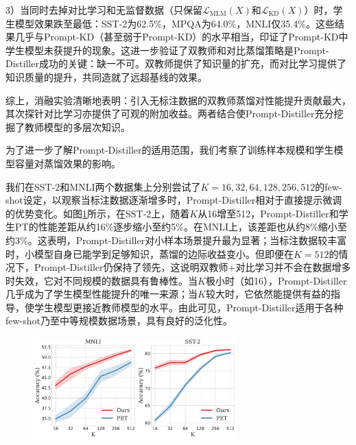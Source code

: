 \documentclass[../main.tex]{subfiles}
\begin{document}
3）当同时去掉对比学习和无监督数据（只保留$\mathcal{L}_{\text{MLM}}(X)$和$\mathcal{L}_{\text{KD}}(X)$）时，学生模型效果跌至最低：SST-2为62.5\%，MPQA为64.0\%，MNLI仅35.4\%。这些结果几乎与Prompt-KD（甚至弱于Prompt-KD）的水平相当，印证了Prompt-KD中学生模型未获提升的现象。这进一步验证了双教师和对比蒸馏策略是Prompt-Distiller成功的关键：缺一不可。双教师提供了知识量的扩充，而对比学习提供了知识质量的提升，共同造就了远超基线的效果。

综上，消融实验清晰地表明：引入无标注数据的双教师蒸馏对性能提升贡献最大，其次探针对比学习亦提供了可观的附加收益。两者结合使Prompt-Distiller充分挖掘了教师模型的多层次知识。

\label{sec:3-5-4}
为了进一步了解Prompt-Distiller的适用范围，我们考察了训练样本规模和学生模型容量对蒸馏效果的影响。


我们在SST-2和MNLI两个数据集上分别尝试了$K=16, 32, 64, 128, 256, 512$的few-shot设定，以观察当标注数据逐渐增多时，Prompt-Distiller相对于直接提示微调的优势变化。如图\ref{fig:datasize}所示，在SST-2上，随着$K$从16增至512，Prompt-Distiller和学生PT的性能差距从约16\%逐步缩小至约5\%。在MNLI上，该差距也从约8\%缩小至约3\%。这表明，Prompt-Distiller对小样本场景提升最为显著；当标注数据较丰富时，小模型自身已能学到足够知识，蒸馏的边际收益变小。但即便在$K=512$的情况下，Prompt-Distiller仍保持了领先，这说明双教师+对比学习并不会在数据增多时失效，它对不同规模的数据具有鲁棒性。当$K$极小时（如16），Prompt-Distiller几乎成为了学生模型性能提升的唯一来源；当$K$较大时，它依然能提供有益的指导，使学生模型更接近教师模型的水平。由此可见，Prompt-Distiller适用于各种few-shot乃至中等规模数据场景，具有良好的泛化性。

\begin{figure}[htbp]
	\centering
	\includegraphics[width=0.7\textwidth]{plot.pdf}
	\label{fig:datasize}
\end{figure}
\end{document}
